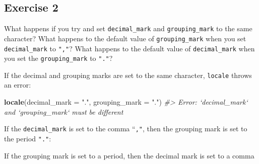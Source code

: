 \documentclass[]{book}
\newenvironment{Shaded}{\begin{snugshade}}{\end{snugshade}}
\newcommand{\CommentTok}[1]{\textcolor[rgb]{0.56,0.35,0.01}{\textit{#1}}}
\newcommand{\DataTypeTok}[1]{\textcolor[rgb]{0.13,0.29,0.53}{#1}}
\newcommand{\KeywordTok}[1]{\textcolor[rgb]{0.13,0.29,0.53}{\textbf{#1}}}
\newcommand{\NormalTok}[1]{#1}
\newcommand{\StringTok}[1]{\textcolor[rgb]{0.31,0.60,0.02}{#1}}
\theoremstyle{plain}
\theoremstyle{remark}
\theoremstyle{definition}
\theoremstyle{definition}
\theoremstyle{definition}
\theoremstyle{remark}
\begin{document}
\hypertarget{exercise-2-19}{%
\subsection{Exercise 2}\label{exercise-2-19}}

What happens if you try and set \texttt{decimal\_mark} and
\texttt{grouping\_mark} to the same character? What happens to the
default value of \texttt{grouping\_mark} when you set
\texttt{decimal\_mark} to \texttt{","}? What happens to the default
value of \texttt{decimal\_mark} when you set the \texttt{grouping\_mark}
to \texttt{"."}?

If the decimal and grouping marks are set to the same character,
\texttt{locale} throws an error:

\begin{Shaded}
\begin{Highlighting}[]
\KeywordTok{locale}\NormalTok{(}\DataTypeTok{decimal_mark =} \StringTok{"."}\NormalTok{, }\DataTypeTok{grouping_mark =} \StringTok{"."}\NormalTok{)}
\CommentTok{#> Error: `decimal_mark` and `grouping_mark` must be different}
\end{Highlighting}
\end{Shaded}

If the \texttt{decimal\_mark} is set to the comma ``\texttt{,"}, then
the grouping mark is set to the period \texttt{"."}:

\begin{Shaded}
\end{Shaded}

If the grouping mark is set to a period, then the decimal mark is set to
a comma
\end{document}
